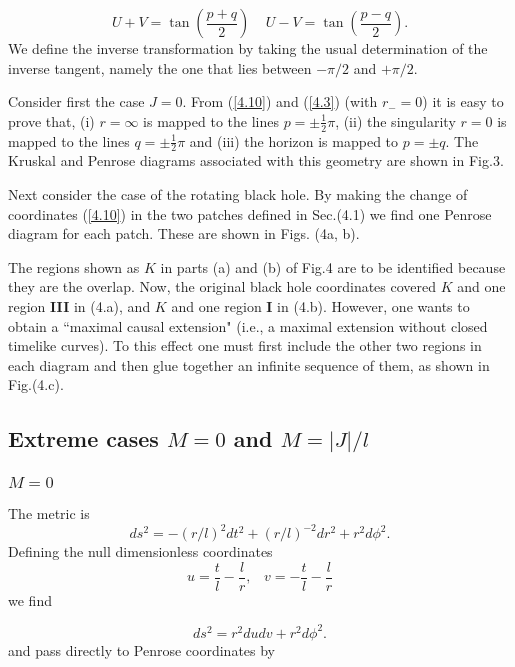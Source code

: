 \documentclass[12pt]{article}
\newcounter{c1} \newcounter{c2}
\newcommand{\bb}{\begin{equation}}
\newcommand{\ee}{\end{equation}}
\newcommand{\m}{\mbox{$\frac{1}{2}$}}
\begin{document}
\begin{equation}
U+V = \tan\left(\frac{p+q}{2}\right) \;\;\;\; U-V =
\tan\left(\frac{p-q}{2}\right).
\label{4.10}
\end{equation}
%
We define the inverse transformation by taking the usual determination of the
 inverse tangent, namely the one that lies between $- \pi/2$ and $+ \pi/2$.

Consider first the case $J=0$. From (\ref{4.10}) and (\ref{4.3})
(with $r_-=0$) it is easy to prove that, (i) $r=\infty$ is mapped to
the lines $p=\pm \m\pi$, (ii) the singularity $r=0$ is mapped to
the lines $q=\pm \m \pi$ and (iii) the horizon is mapped to $p=\pm
q$. The Kruskal and Penrose diagrams associated with this
geometry are shown in Fig.3.

Next consider the case of the rotating black hole. By making the
change of coordinates (\ref{4.10}) in the two patches defined in
Sec.(4.1) we find one Penrose diagram for each patch.  These are
shown in Figs. (4a, b).

The regions shown as $K$ in parts (a) and (b) of Fig.4 are to be
identified because they are the overlap. Now, the original black
hole coordinates covered $K$ and one region {\bf III} in (4.a),
and $K$ and one region {\bf I} in (4.b). However, one wants to
obtain a ``maximal causal extension" (i.e., a maximal extension
without closed timelike curves). To this effect one must first
include the other two regions in each diagram and then glue
together an infinite sequence of them, as shown in Fig.(4.c).



\subsection{Extreme cases $M=0$ and $M=|J|/l$}


\subsubsection{{\bf $M=0$}}

The metric is
\bb
ds^2 = -(r/l)^2 dt^2 + (r/l)^{-2} dr^2 + r^2 d\phi^2.
\label{4.11}
\ee
%
Defining the null dimensionless coordinates
\bb
u=\frac{t}{l}-\frac{l}{r}, \;\;\; v=-\frac{t}{l}-\frac{l}{r}
\label{4.12}
\ee
%
we find

\bb
ds^2= r^2dudv + r^2d\phi^2.
\label{4.13}
\ee
%
and pass directly to Penrose coordinates by
\end{document}
